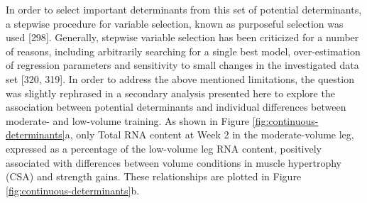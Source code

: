 \documentclass[twoside,10pt]{gihclass} %
\begin{document}
In order to select important determinants from this set of potential determinants, a stepwise procedure for variable selection, known as purposeful selection was used
{[}298{]}.
Generally, stepwise variable selection has been criticized for a number of reasons, including arbitrarily searching for a single best model, over-estimation of regression parameters and sensitivity to small changes in the investigated data set
{[}320, 319{]}.
In order to address the above mentioned limitations, the question was slightly rephrased in a secondary analysis presented here to explore the association between potential determinants and individual differences between moderate- and low-volume training.
As shown in Figure \ref{fig:continuous-determinants}a, only Total RNA content at Week 2 in the moderate-volume leg, expressed as a percentage of the low-volume leg RNA content, positively associated with differences between volume conditions in muscle hypertrophy (CSA) and strength gains. These relationships are plotted in Figure \ref{fig:continuous-determinants}b.
\end{document}
